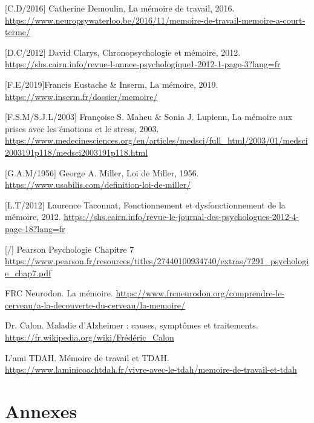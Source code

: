 \documentclass[11pt,a4paper]{report}
\begin{document}
\begin{thebibliography}{9}

        [C.D/2016] Catherine Demoulin, La mémoire de travail, 2016. \break
        \url{https://www.neuropsywaterloo.be/2016/11/memoire-de-travail-memoire-a-court-terme/}
    
        [D.C/2012]  David Clarys, Chronopsychologie et mémoire, 2012. \break
        \url{https://shs.cairn.info/revue-l-annee-psychologique1-2012-1-page-3?lang=fr}

        [F.E/2019]Francis Eustache \& Inserm, La mémoire, 2019. \break
        \url{https://www.inserm.fr/dossier/memoire/}

        [F.S.M/S.J.L/2003] Françoise S. Maheu \& Sonia J. Lupienn, La mémoire aux prises avec les émotions et le stress, 2003. \break
        \url{https://www.medecinesciences.org/en/articles/medsci/full_html/2003/01/medsci2003191p118/medsci2003191p118.html}

        [G.A.M/1956] George A. Miller, Loi de Miller, 1956. \break
        \url{https://www.usabilis.com/definition-loi-de-miller/}
    
        [L.T/2012] Laurence Taconnat, Fonctionnement et dysfonctionnement de la mémoire, 2012. \break
        \url{https://shs.cairn.info/revue-le-journal-des-psychologues-2012-4-page-18?lang=fr}

        [/] Pearson Psychologie Chapitre 7 \break
        \url{https://www.pearson.fr/resources/titles/27440100934740/extras/7291_psychologie_chap7.pdf}
     
        FRC Neurodon. La mémoire. \break
        \url{https://www.frcneurodon.org/comprendre-le-cerveau/a-la-decouverte-du-cerveau/la-memoire/}

        Dr. Calon. Maladie d'Alzheimer : causes, symptômes et traitements. \break
        \url{https://fr.wikipedia.org/wiki/Frédéric_Calon}
    
        L'ami TDAH. Mémoire de travail et TDAH. \break
    \url{https://www.laminicoachtdah.fr/vivre-avec-le-tdah/memoire-de-travail-et-tdah}

\end{thebibliography}

\chapter*{Annexes}
\end{document}

